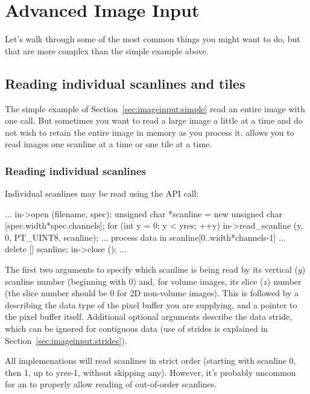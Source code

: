\section{Advanced Image Input}
\label{sec:advancedimageinput}

Let's walk through some of the most common things you might want to do,
but that are more complex than the simple example above.


\subsection{Reading individual scanlines and tiles}
\label{sec:imageinput:scanlinestiles}

The simple example of Section~\ref{sec:imageinput:simple} read an
entire image with one call.  But sometimes you want to read a large
image a
little at a time and do not wish to retain the entire image in memory
as you process it.  \product allows you to read images
one scanline at a time or one tile at a time.

\subsubsection{Reading individual scanlines}

Individual scanlines may be read using the \readscanline API
call:

\begin{code}
        ...
        in->open (filename, spec);
        unsigned char *scanline = new unsigned char [spec.width*spec.channels];
        for (int y = 0;  y < yres;  ++y) {
            in->read_scanline (y, 0, PT_UINT8, scanline);
            ... process data in scanline[0..width*channels-1] ...
        }
        delete [] scanline;
        in->close ();
        ...
\end{code}

The first two arguments to \readscanline specify which scanline
is being read by its vertical ($y$) scanline number (beginning with 0)
and, for volume images, its slice ($z$) number (the slice number should
be 0 for 2D non-volume images).  This is followed by a \ParamBaseType
describing the data type of the pixel buffer you are supplying, and a
pointer to the pixel buffer itself.  Additional optional arguments
describe the data stride, which can be ignored for contiguous data (use
of strides is explained in Section~\ref{sec:imageinput:strides}).

All \ImageInput implemenations will read scanlines in strict order
(starting with scanline 0, then 1, up to {\kw yres-1}, without skipping
any).  However, it's probably uncommon for an \ImageInput to properly
allow reading of out-of-order scanlines.

